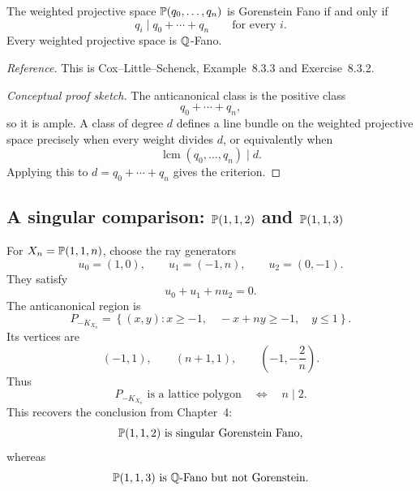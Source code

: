 \begin{proposition}
\label{prop:weighted-projective-gorenstein-fano}
The weighted projective space \(\mathbb{P}(q_0,\dots,q_n)\) is Gorenstein
Fano if and only if
\[
q_i\mid q_0+\cdots+q_n
\qquad
\text{for every }i.
\]
Every weighted projective space is \(\mathbb{Q}\)-Fano.
\end{proposition}

\noindent
\textit{Reference.}
This is Cox--Little--Schenck, Example~8.3.3 and Exercise~8.3.2.

\begin{proof}[Conceptual proof sketch]
The anticanonical class is the positive class
\[
q_0+\cdots+q_n,
\]
so it is ample. A class of degree \(d\) defines a line bundle on the
weighted projective space precisely when every weight divides \(d\),
or equivalently when
\[
\operatorname{lcm}(q_0,\dots,q_n)\mid d.
\]
Applying this to \(d=q_0+\cdots+q_n\) gives the criterion.
\end{proof}

\subsection{A singular comparison: \texorpdfstring{\(\mathbb{P}(1,1,2)\)}{P(1,1,2)} and
\texorpdfstring{\(\mathbb{P}(1,1,3)\)}{P(1,1,3)}}

For \(X_n=\mathbb{P}(1,1,n)\), choose the ray generators
\[
u_0=(1,0),
\qquad
u_1=(-1,n),
\qquad
u_2=(0,-1).
\]
They satisfy
\[
u_0+u_1+n u_2=0.
\]
The anticanonical region is
\[
P_{-K_{X_n}}
=
\left\{
(x,y):
 x\geq-1,
\quad
-x+ny\geq-1,
\quad
y\leq1
\right\}.
\]
Its vertices are
\[
(-1,1),
\qquad
(n+1,1),
\qquad
\left(-1,-\frac{2}{n}\right).
\]
Thus
\[
P_{-K_{X_n}}
\text{ is a lattice polygon}
\quad\Longleftrightarrow\quad
n\mid2.
\]
This recovers the conclusion from Chapter~4:
\[
\mathbb{P}(1,1,2)
\text{ is singular Gorenstein Fano},
\]
whereas
\[
\mathbb{P}(1,1,3)
\text{ is \(\mathbb{Q}\)-Fano but not Gorenstein}.
\]

